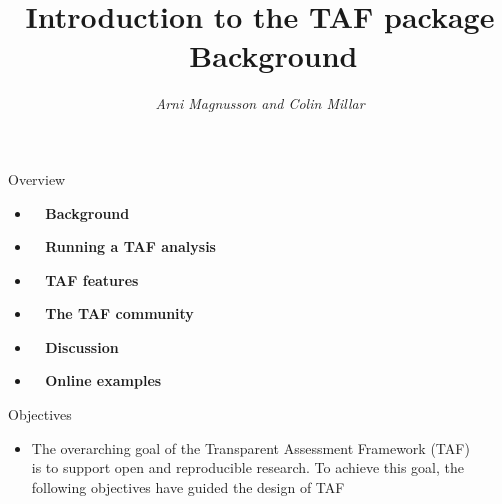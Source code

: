 \documentclass[aspectratio=169]{beamer}
\begin{document}
\begin{frame}
  \title{\darkblue Introduction to the TAF package\\[1ex]
    \normalsize{}~ Background}
  \author{\vspace{-16ex}\small\darkgray\it Arni Magnusson and Colin Millar}
  \date{}
  \titlepage
\end{frame}


\begin{frame}{Overview}
  \begin{itemize}
    \item[] {\bf{}~ Background} \\[3ex]
    \item[] {\bf{}~ Running a TAF analysis} \\[3ex]
    \item[] {\bf{}~ TAF features} \\[3ex]
    \item[] {\bf{}~ The TAF community} \\[3ex]
    \item[] {\bf{}~ Discussion} \\[3ex]
    \item[] {\bf{}~ Online examples} \\[3ex]
  \end{itemize}
\end{frame}


\begin{frame}{Objectives}\small
  \begin{itemize}
    \item[] The overarching goal of the Transparent Assessment Framework
    (TAF)\\[1ex]
    is to support {\green open and reproducible} research. To achieve this goal,
    the\\[1ex]
    following objectives have guided the design of TAF\\[4ex]
  \end{itemize}
\end{frame}
\end{document}
